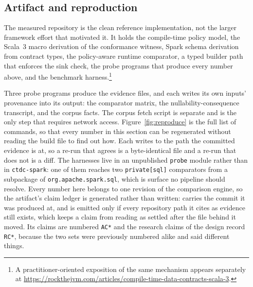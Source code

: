 \subsection{Artifact and reproduction}

The measured repository is the clean reference implementation, not the larger framework effort that motivated it. It holds the compile-time policy model, the Scala~3 macro derivation of the conformance witness, Spark schema derivation from contract types, the policy-aware runtime comparator, a typed builder path that enforces the sink check, the probe programs that produce every number above, and the benchmark harness.\footnote{A practitioner-oriented exposition of the same mechanism appears separately at \url{https://rockthejvm.com/articles/compile-time-data-contracts-scala-3}.}

Three probe programs produce the evidence files, and each writes its own inputs' provenance into its output: the comparator matrix, the nullability-consequence transcript, and the corpus facts. The corpus fetch script is separate and is the only step that requires network access. Figure~\ref{fig:reproduce} is the full list of commands, so that every number in this section can be regenerated without reading the build file to find out how. Each writes to the path the committed evidence is at, so a re-run that agrees is a byte-identical file and a re-run that does not is a diff. The harnesses live in an unpublished \texttt{probe} module rather than in \texttt{ctdc-spark}: one of them reaches two \texttt{private[sql]} comparators from a subpackage of \texttt{org.apache.spark.sql}, which is surface no pipeline should resolve. Every number here belongs to one revision of the comparison engine, so the artifact's claim ledger is generated rather than written:  carries the commit it was produced at, and is emitted only if every repository path it cites as evidence still exists, which keeps a claim from reading as settled after the file behind it moved. Its claims are numbered \texttt{AC*} and the research claims of the design record \texttt{RC*}, because the two sets were previously numbered alike and said different things.


